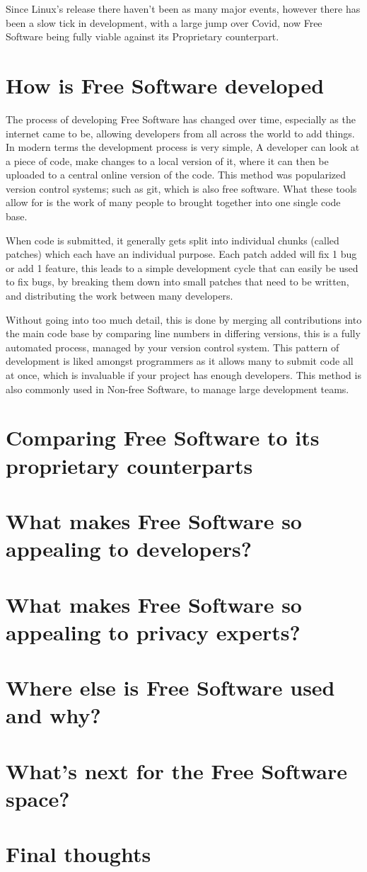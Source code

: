 \documentclass[a4paper,12pt]{article}
\begin{document}
{Since Linux's release there haven't been as many major events, however there has been a slow tick
in development, with a large jump over Covid, now Free Software being fully viable against
its Proprietary counterpart.

\section{How is Free Software developed}
The process of developing Free Software has changed over time, especially as the internet came to be,
allowing developers from all across the world to add things. In modern terms the development process is 
very simple, A developer can look at a piece of code, make changes to a local version of it, where it 
can then be uploaded to a central online version of the code. This method was popularized version 
control systems; such as git\cite{GIT}, which is also free software. What these tools allow for is 
the work of many people to brought together into one single code base.

When code is submitted, it generally gets split into individual chunks (called patches) which each
have an individual purpose. Each patch added will fix 1 bug or add 1 feature, this leads to a simple
development cycle that can easily be used to fix bugs, by breaking them down into small patches that
need to be written, and distributing the work between many developers. 

Without going into too much detail, this is done by merging all contributions into the main code base
by comparing line numbers in differing versions, this is a fully automated process, managed by your
version control system. This pattern of development is liked amongst programmers as it allows many 
to submit code all at once, which is invaluable if your project has enough developers. This method
is also commonly used in Non-free Software, to manage large development teams\cite{NONFREEvcs}.

\section{Comparing Free Software to its proprietary counterparts}
\section{What makes Free Software so appealing to developers?}
\section{What makes Free Software so appealing to privacy experts?}
\section{Where else is Free Software used and why?}
\section{What's next for the Free Software space?}
\section{Final thoughts}

\newpage
\printbibliography
}
\end{document}
